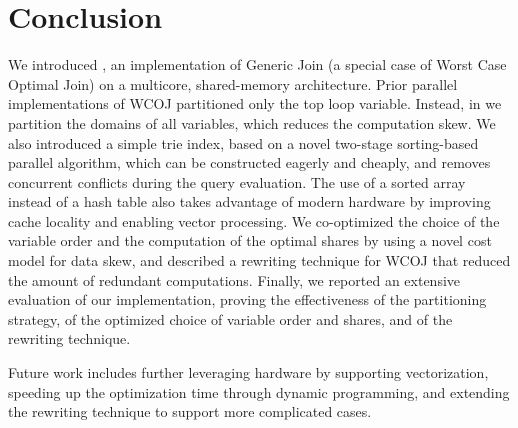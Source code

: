 \section{Conclusion}\label{sec:conclusion}

We introduced \name, an implementation of Generic Join (a special case
of Worst Case Optimal Join) on a multicore, shared-memory
architecture.  Prior parallel implementations of WCOJ partitioned only
the top loop variable.  Instead, in \name we partition the domains of
all variables, which reduces the computation skew.  We also
introduced a simple trie index, based on a novel two-stage
sorting-based parallel algorithm, which can be constructed eagerly and
cheaply, and removes concurrent conflicts during the query evaluation.
The use of a sorted array instead of a hash table also takes advantage
of modern hardware by improving cache locality and enabling vector
processing.  We co-optimized the choice of the variable order and the
computation of the optimal shares by using a novel cost model for data
skew, and described a rewriting technique for WCOJ that reduced the
amount of redundant computations.  Finally, we reported an extensive
evaluation of our implementation, proving the effectiveness of the
partitioning strategy, of the optimized choice of variable order and
shares, and of the rewriting technique.

Future work includes further leveraging hardware by supporting vectorization, 
speeding up the optimization time through dynamic programming, and extending
the rewriting technique to support more complicated cases.


